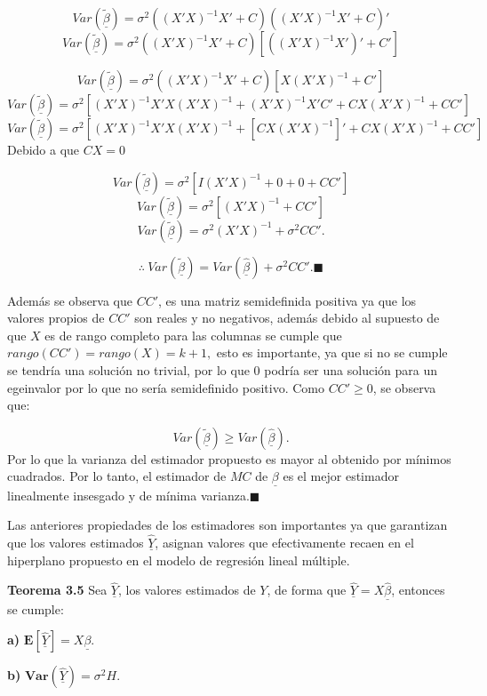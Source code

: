 \documentclass[
  a4paper,
  oneside,
  openany]{book}
\begin{document}
\[
Var\left(\underline{\tilde{\beta}}\right)=\sigma^2((X'X)^{-1}X'+C)((X'X)^{-1}X'+C)'
\]
\[
Var\left(\underline{\tilde{\beta}}\right)=\sigma^2((X'X)^{-1}X'+C)\left[ ((X'X)^{-1}X')'+C'\right]
\]

\[
Var\left(\underline{\tilde{\beta}}\right)=\sigma^2((X'X)^{-1}X'+C)[X(X'X)^{-1}+C']
\]
\[
Var\left(\underline{\tilde{\beta}}\right)=\sigma^2[(X'X)^{-1}X'X(X'X)^{-1}+(X'X)^{-1}X'C'+CX(X'X)^{-1}+CC']
\]
\[
Var\left(\underline{\tilde{\beta}}\right)=\sigma^2\left[(X'X)^{-1}X'X(X'X)^{-1}+[CX(X'X)^{-1}]'+CX(X'X)^{-1}+CC'\right]
\]
Debido a que \(CX=0\)

\[
Var\left(\underline{\tilde{\beta}}\right)=\sigma^2\left[ I(X'X)^{-1}+0+0+CC'\right]
\]
\[
Var\left(\underline{\tilde{\beta}}\right)=\sigma^2[(X'X)^{-1}+CC']
\]
\[
Var\left(\underline{\tilde{\beta}}\right)=\sigma^2(X'X)^{-1}+\sigma^2CC'.
\]

\[
\therefore \  Var\left(\underline{\tilde{\beta}}\right)=Var\left(\underline{\hat{\beta}}\right)+\sigma^2CC'. \blacksquare
\]

Además se observa que \(CC'\), es una matriz semidefinida positiva ya que los valores propios de \(CC'\) son reales y no negativos, además debido al supuesto de que \(X\) es de rango completo para las columnas se cumple que \(rango(CC')=rango(X)=k+1,\) esto es importante, ya que si no se cumple se tendría una solución no trivial, por lo que \(0\) podría ser una solución para un egeinvalor por lo que no sería semidefinido positivo. Como \(CC'\geq0\), se observa que:

\[
Var\left(\underline{\tilde{\beta}}\right) \geq Var\left(\underline{\hat{\beta}}\right).
\]
Por lo que la varianza del estimador propuesto es mayor al obtenido por mínimos cuadrados. Por lo tanto, el estimador de \(MC\) de \(\underline{\beta}\) es el mejor estimador linealmente insesgado y de mínima varianza.\(\blacksquare\)

Las anteriores propiedades de los estimadores son importantes ya que garantizan que los valores estimados \(\underline{\hat{Y}}\), asignan valores que efectivamente recaen en el hiperplano propuesto en el modelo de regresión lineal múltiple.

\textbf{Teorema 3.5} Sea \(\underline{\hat{Y}}\), los valores estimados de \(Y\), de forma que \(\underline{\hat{Y}}=X\underline{\hat{\beta}}\), entonces se cumple:

\textbf{a)} \(\mathbf{E}[\underline{\hat{Y}}]=X\underline{\beta}.\)

\textbf{b)} \(\textbf{Var}(\underline{\hat{Y}})=\sigma^2H.\)
\end{document}
